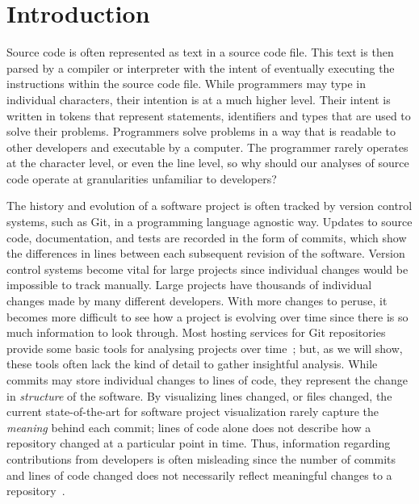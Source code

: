\documentclass[conference]{IEEEtran}
\begin{document}
\section{Introduction}

Source code is often represented as text in a source code file. This text is then parsed by a compiler or interpreter with the intent of eventually executing the instructions within the source code file. While programmers may type in individual characters, their intention is at a much higher level. Their intent is written in tokens that represent statements, identifiers and types that are used to solve their problems. Programmers solve problems in a way that is readable to other developers and executable by a computer. The programmer rarely operates at the character level, or even the line level, so why should our analyses of source code operate at granularities unfamiliar to developers?

The history and evolution of a software project is often tracked by version control systems, such as Git, in a programming language agnostic way. Updates to source code, documentation, and tests are recorded in the form of commits, which show the differences in lines between each subsequent revision of the software. Version control systems become vital for large projects since individual changes would be impossible to track manually. Large projects have thousands of individual changes made by many different developers. With more changes to peruse, it becomes more difficult to see how a project is evolving over time since there is so much information to look through. Most hosting services for Git repositories provide some basic tools for analysing projects over time~\cite{github-graphs,bitbucket-graphs}; but, as we will show, these tools often lack the kind of detail to gather insightful analysis. While commits may store individual changes to lines of code, they represent the change in \emph{structure} of the software.  By visualizing lines changed, or files changed, the current state-of-the-art for software project visualization rarely capture the \emph{meaning} behind each commit; lines of code alone does not describe how a repository changed at a particular point in time. Thus, information regarding contributions from developers is often misleading since the number of commits and lines of code changed does not necessarily reflect meaningful changes to a repository~\cite{robles2014}.
\end{document}
